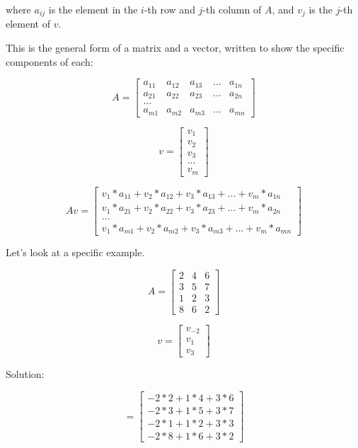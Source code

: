 where $a_{ij}$ is the element in the $i$-th row and $j$-th column of $A$, and $v_j$ is the $j$-th element of $v$.

This is the general form of a matrix and a vector, written to show the specific components of each:


 $$A = \begin{bmatrix}
 a_{11} &a_{12}  &a_{13} &... &a_{1n}  \\
 a_{21} &a_{22}  &a_{23} &... &a_{2n}  \\
 ... \\
 a_{m1} &a_{m2}  &a_{m3} &... &a_{mn}  
\end{bmatrix}$$



$$v = \begin{bmatrix}
 v_{1}  \\
 v_{2} \\
 v_{3} \\
 ... \\
 v_{m} 
\end{bmatrix}$$

 $$Av =\begin{bmatrix}
 v_{1}*a_{11} +v_{2}*a_{12}  +v_{3}*a_{13} +... +v_{m}*a_{1n}  \\
 v_{1}*a_{21} +v_{2}*a_{22}  +v_{3}*a_{23} +... +v_{m}*a_{2n}  \\
 ... \\
 v_{1}*a_{m1} +v_{2}*a_{m2}  +v_{3}*a_{m3} +... +v_{m}*a_{mn}  
\end{bmatrix}$$

Let's look at a specific example.

$$A = \begin{bmatrix}
 2  &4 &6  \\
3 &5 &7  \\
 1  &2  &3  \\
 8  &6  &2 
\end{bmatrix}$$


$$v = \begin{bmatrix}
 v_{-2}  \\
 v_{1} \\
 v_{3} 
\end{bmatrix}$$

Solution:

$$= \begin{bmatrix}
-2*2+1*4+3*6\\
-2*3+1*5+3*7\\
 -2*1+1*2+3*3\\
-2*8+1*6+3*2
\end{bmatrix}$$

